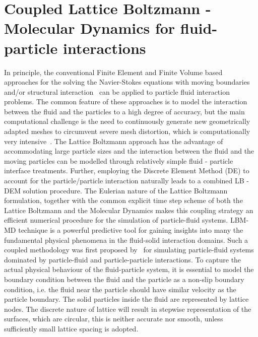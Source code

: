 \section{Coupled Lattice Boltzmann - Molecular Dynamics for fluid-particle interactions}
In principle, the conventional Finite Element and Finite Volume based approaches for the solving the Navier-Stokes equations with moving boundaries and/or structural interaction~\citep{Bathe2004} can be applied to particle fluid interaction problems. The common feature of these approaches is to model the interaction between the fluid and the particles to a high degree of accuracy, but the main computational challenge is the need to continuously generate new geometrically adapted meshes to circumvent severe mesh distortion, which is computationally very intensive~\citep{Han2007}. The Lattice Boltzmann approach has the advantage of accommodating large particle sizes and the interaction between the fluid and the moving particles can be modelled through relatively simple fluid - particle interface treatments. Further, employing the Discrete Element Method (DE) to account for the particle/particle interaction naturally leads to a combined LB - DEM solution procedure. The Eulerian nature of the Lattice Boltzmann formulation, together with the common explicit time step scheme of both the Lattice Boltzmann and the Molecular Dynamics makes this coupling strategy an efficient numerical procedure for the simulation of particle-fluid systems. LBM-MD technique is a powerful predictive tool for gaining insights into many the fundamental physical phenomena in the fluid-solid interaction domains. Such a coupled methodology was first proposed by~\citep{Cook2004} for simulating particle-fluid systems dominated by particle-fluid and particle-particle interactions. To capture the actual physical behaviour of the fluid-particle system, it is essential to model the boundary condition between the fluid and the particle as a non-slip boundary condition, i.e. the fluid near the particle should have similar velocity as the particle boundary. The solid particles inside the fluid are represented by lattice nodes. The discrete nature of lattice will result in stepwise representation of the surfaces, which are circular, this is neither accurate nor smooth, unless sufficiently small lattice spacing is adopted. 


